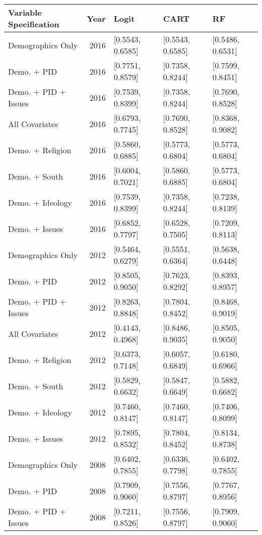 \begin{longtable}{lrlll}
  \toprule
Variable Specification & Year & Logit & CART & RF \\ 
  \midrule
Demographics Only & 2016 & [0.5543, 0.6585] & [0.5543, 0.6585] & [0.5486, 0.6531] \\ 
  Demo. + PID & 2016 & [0.7751, 0.8579] & [0.7358, 0.8244] & [0.7599, 0.8451] \\ 
  Demo. + PID + Issues & 2016 & [0.7539, 0.8399] & [0.7358, 0.8244] & [0.7690, 0.8528] \\ 
  All Covariates & 2016 & [0.6793, 0.7745] & [0.7690, 0.8528] & [0.8368, 0.9082] \\ 
  Demo. + Religion & 2016 & [0.5860, 0.6885] & [0.5773, 0.6804] & [0.5773, 0.6804] \\ 
  Demo. + South & 2016 & [0.6004, 0.7021] & [0.5860, 0.6885] & [0.5773, 0.6804] \\ 
  Demo. + Ideology & 2016 & [0.7539, 0.8399] & [0.7358, 0.8244] & [0.7238, 0.8139] \\ 
  Demo. + Issues & 2016 & [0.6852, 0.7797] & [0.6528, 0.7505] & [0.7209, 0.8113] \\ 
  Demographics Only & 2012 & [0.5464, 0.6279] & [0.5551, 0.6364] & [0.5638, 0.6448] \\ 
  Demo. + PID & 2012 & [0.8505, 0.9050] & [0.7623, 0.8292] & [0.8393, 0.8957] \\ 
  Demo. + PID + Issues & 2012 & [0.8263, 0.8848] & [0.7804, 0.8452] & [0.8468, 0.9019] \\ 
  All Covariates & 2012 & [0.4143, 0.4968] & [0.8486, 0.9035] & [0.8505, 0.9050] \\ 
  Demo. + Religion & 2012 & [0.6373, 0.7148] & [0.6057, 0.6849] & [0.6180, 0.6966] \\ 
  Demo. + South & 2012 & [0.5829, 0.6632] & [0.5847, 0.6649] & [0.5882, 0.6682] \\ 
  Demo. + Ideology & 2012 & [0.7460, 0.8147] & [0.7460, 0.8147] & [0.7406, 0.8099] \\ 
  Demo. + Issues & 2012 & [0.7895, 0.8532] & [0.7804, 0.8452] & [0.8134, 0.8738] \\ 
  Demographics Only & 2008 & [0.6402, 0.7855] & [0.6336, 0.7798] & [0.6402, 0.7855] \\ 
  Demo. + PID & 2008 & [0.7909, 0.9060] & [0.7556, 0.8797] & [0.7767, 0.8956] \\ 
  Demo. + PID + Issues & 2008 & [0.7211, 0.8526] & [0.7556, 0.8797] & [0.7909, 0.9060] \\ 

\end{longtable}

